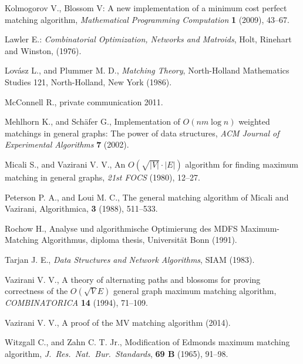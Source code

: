 \documentclass[12pt,twoside,a4paper]{article}
\begin{document}
\begin{thebibliography}{99}
 Kolmogorov V., Blossom V: A new implementation of a minimum cost
perfect matching algorithm, {\em Mathematical Programming Computation\/} {\bf 1} 
(2009), 43--67.

 Lawler E.:
{\em Combinatorial Optimization, Networks and Matroids}, Holt, Rinehart and
Winston, (1976).

 Lov\'{a}sz L., and Plummer M. D.,
{\em Matching Theory\/}, North-Holland Mathematics Studies 121, North-Holland,
New York (1986).

 McConnell R., private communication 2011.

 Mehlhorn K., and Sch\"{a}fer G., Implementation of $O(nm \log n)$ weighted
matchings in general graphs: The power of data structures, {\em ACM Journal of Experimental
Algorithms\/} {\bf 7} (2002).

 Micali S., and Vazirani V. V.,
An $O(\sqrt{|V|}\cdot |E|)$ algorithm for finding maximum matching in
general graphs, {\em 21st FOCS\/} (1980), 12--27.

 Peterson P. A., and Loui M. C., The general matching algorithm
of Micali and Vazirani, Algorithmica, {\bf 3} (1988), 511--533.

 Rochow H., Analyse und algorithmische Optimierung des MDFS
Maximum-Matching Algorithmus, diploma thesis, Universit\"at Bonn (1991).

 Tarjan J. E.,
{\em Data Structures and Network Algorithms}, SIAM (1983).

 Vazirani V. V.,
A theory of alternating paths and blossoms for proving correctness of
the $O(\sqrt{V}E)$ general graph maximum matching algorithm, 
{\em COMBINATORICA\/} {\bf 14} (1994), 71--109.

 Vazirani V. V., A proof of the MV matching algorithm (2014).

 Witzgall C., and Zahn C. T. Jr.,
Modification of Edmonds maximum matching algorithm,
{\em J.~Res.~Nat.~Bur.~Standards\/}, {\bf 69 B} (1965), 91--98.
\end{thebibliography}
\end{document}
